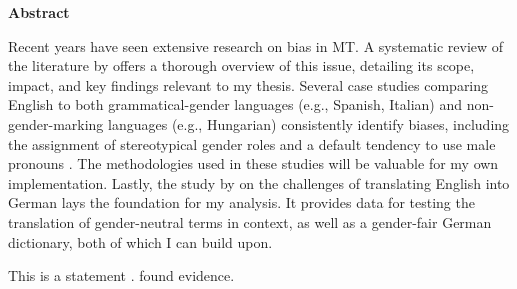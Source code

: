 \thispagestyle{empty}

\vspace*{1cm}

\begin{center}
    \textbf{Abstract}
\end{center}

\vspace*{1cm}

\noindent 
Recent years have seen extensive research on bias in MT. A systematic review of the literature by \citeauthor{shresthaExploringGenderBiases2022} offers a thorough overview of this issue, detailing its scope, impact, and key findings relevant to my thesis. Several case studies comparing English to both grammatical-gender languages (e.g., Spanish, Italian) and non-gender-marking languages (e.g., Hungarian) consistently identify biases, including the assignment of stereotypical gender roles and a default tendency to use male pronouns \cite{stanovskyEvaluatingGenderBias2019,pratesAssessingGenderBias2019,smacchiaDoesAIReflect2024}. The methodologies used in these studies will be valuable for my own implementation. Lastly, the study by \citeauthor{lardelliBuildingBridgesDataset2024} on the challenges of translating English into German lays the foundation for my analysis. It provides data for testing the translation of gender-neutral terms in context, as well as a gender-fair German dictionary, both of which I can build upon.

This is a statement \citep{barclayInvestigatingMarkersDrivers2024}.
\citet{lardelliBuildingBridgesDataset2024} found evidence.

